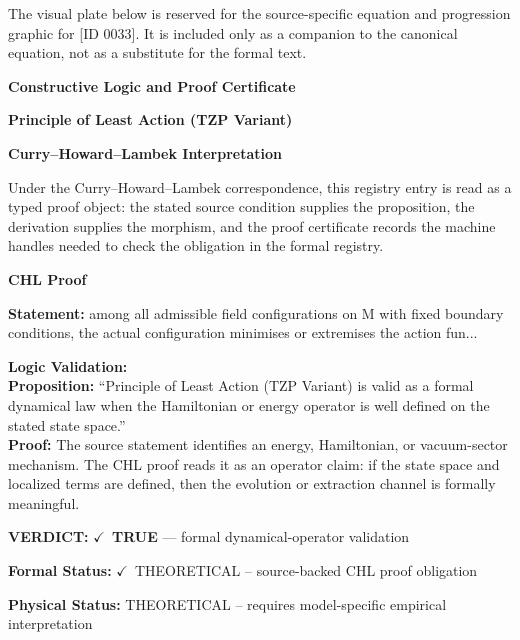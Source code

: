 \begingroup\footnotesize\sloppy
The visual plate below is reserved for the source-specific equation and progression graphic for [ID 0033]. It is included only as a companion to the canonical equation, not as a substitute for the formal text.
\par\endgroup
\ifTZPDarkEdition
{}
\fi

\clearpage
\begingroup\tzpsupportsetup
\noindent\textbf{\fontsize{10.8pt}{12.8pt}\selectfont [ID 0033] Constructive Logic and Proof Certificate}\par
\noindent\textbf{\fontsize{10pt}{12pt}\selectfont Principle of Least Action (TZP Variant)}\par
\vspace{0.45em}
\begingroup
\footnotesize
\setlength{\parskip}{0.22em}
\setlength{\parindent}{0pt}
\noindent\textbf{Curry--Howard--Lambek Interpretation}\par
Under the Curry--Howard--Lambek correspondence, this registry entry is read as a typed proof
object: the stated source condition supplies the proposition, the derivation supplies the
morphism, and the proof certificate records the machine handles needed to check the obligation
in the formal registry.

\vspace{0.45em}
\noindent\textbf{CHL Proof}\par
\textbf{Statement:} among all admissible field configurations  on M with fixed boundary conditions, the
actual configuration minimises or extremises the action fun...

\textbf{Logic Validation:}\\
\textbf{Proposition:} ``Principle of Least Action (TZP Variant) is valid as a formal dynamical law when the
Hamiltonian or energy operator is well defined on the stated state space.''\\
\textbf{Proof:} The source statement identifies an energy, Hamiltonian, or vacuum-sector mechanism. The
CHL proof reads it as an operator claim: if the state space and localized terms are
defined, then the evolution or extraction channel is formally meaningful.

\textbf{VERDICT:} \ensuremath{\checkmark}\ \textbf{TRUE} --- formal dynamical-operator validation

\textbf{Formal Status:} \ensuremath{\checkmark}\ THEORETICAL -- source-backed CHL proof obligation

\textbf{Physical Status:} THEORETICAL -- requires model-specific empirical interpretation
\par\vspace{0.45em}
\par
\ifTZPDarkEdition
{}
\fi
\endgroup
\endgroup
